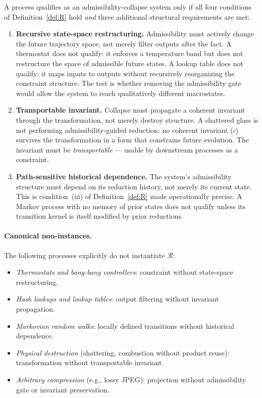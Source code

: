 \documentclass[12pt, a4paper]{article}
\theoremstyle{plain}
\theoremstyle{definition}
\theoremstyle{remark}
\newcommand{\Rcal}{\mathcal{R}}
\begin{document}
A process qualifies as an admissibility-collapse system only if
all four conditions of Definition~\ref{def:R} hold
\emph{and} three additional structural requirements are met:

\begin{enumerate}
  \item \textbf{Recursive state-space restructuring.}
        Admissibility must actively change the future trajectory space,
        not merely filter outputs after the fact.
        A thermostat does not qualify: it enforces a temperature band
        but does not restructure the space of admissible future states.
        A lookup table does not qualify: it maps inputs to outputs
        without recursively reorganizing the constraint structure.
        The test is whether removing the admissibility gate would
        allow the system to reach qualitatively different macrostates.

  \item \textbf{Transportable invariant.}
        Collapse must propagate a coherent invariant through the
        transformation, not merely destroy structure.
        A shattered glass is not performing admissibility-guided
        reduction: no coherent invariant ($\iota$) survives the
        transformation in a form that constrains future evolution.
        The invariant must be \emph{transportable} --- usable by
        downstream processes as a constraint.

  \item \textbf{Path-sensitive historical dependence.}
        The system's admissibility structure must depend on its
        reduction history, not merely its current state.
        This is condition~(iii) of Definition~\ref{def:R} made
        operationally precise.
        A Markov process with no memory of prior states does not
        qualify unless its transition kernel is itself modified by
        prior reductions.
\end{enumerate}

\paragraph{Canonical non-instances.}

The following processes explicitly do not instantiate $\Rcal$:
\begin{itemize}
  \item \emph{Thermostats and bang-bang controllers}:
        constraint without state-space restructuring.
  \item \emph{Hash lookups and lookup tables}:
        output filtering without invariant propagation.
  \item \emph{Markovian random walks}:
        locally defined transitions without historical dependence.
  \item \emph{Physical destruction} (shattering, combustion without
        product reuse): transformation without transportable invariant.
  \item \emph{Arbitrary compression} (e.g., lossy JPEG):
        projection without admissibility gate or invariant preservation.
\end{itemize}
\end{document}
